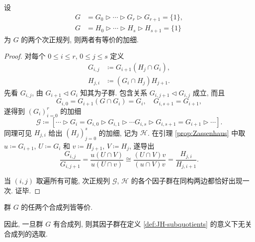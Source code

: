 \begin{theorem}\label{prop:Schreier}
	设
	\begin{align*}
		G & = G_0 \rhd \cdots \rhd G_r \rhd G_{r+1} = \{1\}, \\
		G & = H_0 \rhd \cdots \rhd H_s \rhd H_{s+1} = \{1\}
	\end{align*}
	为 $G$ 的两个次正规列, 则两者有等价的加细.
\end{theorem}
\begin{proof}
	对每个 $0 \leq i \leq r$, $0 \leq j \leq s$ 定义
	\begin{align*}
		G_{i,j} & \coloneqq G_{i+1} (H_j \cap G_i), \\
		H_{j,i} & \coloneqq (G_i \cap H_j) H_{j+1}.
	\end{align*}
	先看 $G_{i,j}$, 由 $G_{i+1} \lhd G_i$ 知其为子群. 包含关系 $G_{i, j+1} \lhd G_{i,j}$ 成立, 而且
	\[ G_{i,0} = G_{i+1} (G \cap G_i) = G_i, \quad G_{i,s+1} = G_{i+1}, \]
	遂得到 $(G_i)_{i=0}^r$ 的加细
	\[ \mathcal{G} \coloneqq \left[ \cdots \rhd G_i = G_{i, 0} \rhd G_{i, 1} \rhd \cdots G_{i, s} \rhd G_{i, s+1}= G_{i+1} \rhd \cdots \right] . \]
	同理可见 $H_{j, i}$ 给出 $(H_j)_{j=0}^s$ 的加细, 记为 $\mathcal{H}$. 在引理 \ref{prop:Zassenhaus} 中取 $u \coloneqq G_{i+1}$, $U \coloneqq G_i$ 和 $v \coloneqq H_{j+1}$, $V \coloneqq H_j$, 遂导出
	\[ \dfrac{G_{i,j}}{G_{i,j+1}} = \dfrac{u(U \cap V)}{u(U \cap v)} \cong \dfrac{(U \cap V)v}{(u \cap V)v} = \dfrac{H_{j,i}}{H_{j,i+1}}. \]
	
	当 $(i,j)$ 取遍所有可能, 次正规列 $\mathcal{G}$, $\mathcal{H}$ 的各个因子群在同构两边都恰好出现一次. 证毕.
\end{proof}

\begin{corollary}\label{cor:JH-group}
	群 $G$ 的任两个合成列皆等价.
\end{corollary}

因此, 一旦群 $G$ 有合成列, 则其因子群在定义 \ref{def:JH-subquotients} 的意义下无关合成列的选取.

